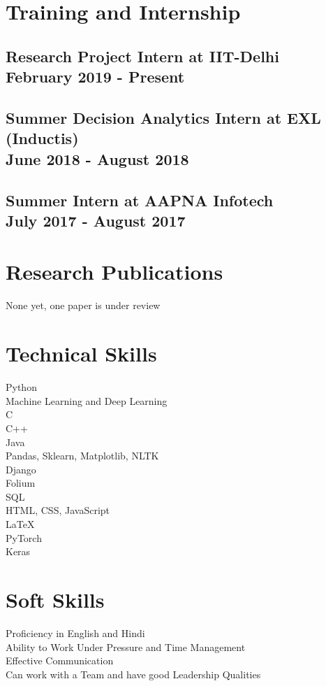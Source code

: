 \documentclass{article}
\begin{document}
\section{Training and Internship}
\subsection{Research Project Intern at IIT-Delhi\\February 2019 - Present}
\subsection{Summer Decision Analytics Intern at EXL (Inductis)\\June 2018 - August 2018}
\subsection{Summer Intern at AAPNA Infotech \\ July 2017 - August 2017}

\section{Research Publications}
None yet, one paper is under review

\section{Technical Skills}
Python
\\ Machine Learning and Deep Learning
\\C
\\C++
\\Java
\\ Pandas, Sklearn, Matplotlib, NLTK
\\ Django
\\ Folium
\\SQL
\\HTML, CSS, JavaScript
\\\LaTeX
\\PyTorch
\\Keras

\section{Soft Skills}
Proficiency in English and Hindi 
\\Ability to Work Under Pressure and Time Management
\\ Effective Communication 
\\ Can work with a Team and have good Leadership Qualities 
\end{document}
